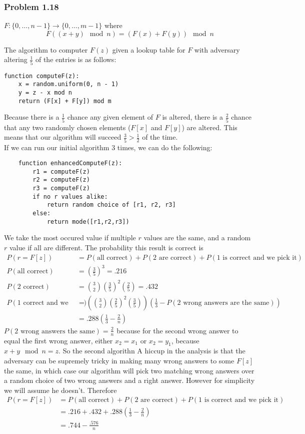 \documentclass[12pt,letterpaper]{article}
\newenvironment{answer}[1]{
  \subsubsection*{Problem #1}
}{\newpage}
\begin{document}
\begin{answer}{1.18}
$F : \{0, \ldots , n -1 \} \rightarrow \{0, \ldots, m-1\}$ where
$$F((x + y) \mod{n}) = (F(x) + F(y)) \mod{n}$$

The algorithm to computer $F(z)$ given a lookup table for $F$ with adversary altering $\frac{1}{5}$ of the entries is as follows:
\begin{verbatim}
function computeF(z):
    x = random.uniform(0, n - 1)
    y = z - x mod n
    return (F[x] + F[y]) mod m
\end{verbatim}

Because there is a $\frac{1}{5}$ chance any given element of $F$ is altered, there is a $\frac{2}{5}$ chance that any two randomly chosen elements ($F[x]$ and $F[y]$) are altered. This means that our algorithm will succeed $\frac{3}{5} > \frac{1}{2}$ of the time.
\\
If we can run our initial algorithm 3 times, we can do the following:
\begin{verbatim}
    function enhancedComputeF(z):
        r1 = computeF(z)
        r2 = computeF(z)
        r3 = computeF(z)
        if no r values alike:
            return random choice of [r1, r2, r3]
        else:
            return mode([r1,r2,r3])
\end{verbatim}
We take the most occured value if multiple $r$ values are the same, and a random $r$ value if all are different. The probability this result is correct is 
\begin{align*}
    P(r = F[z]) &= P(\text{all correct}) + P(\text{2 are correct}) + P(\text{1 is correct and we pick it}) \\
    P(\text{all correct}) &= \left(\frac{3}{5}\right)^3 = .216\\
    P(\text{2 correct}) &= {3 \choose 2}\left(\frac{3}{5}\right)^2 \left(\frac{2}{5}\right) = .432\\
    P(\text{1 correct and we pick it}) &= \left({3 \choose 2}\left(\frac{2}{5}\right)^2\left(\frac{3}{5}\right)\right)(\frac{1}{3} - P(\text{2 wrong answers are the same}))\\
    &= .288\left(\frac{1}{3} - \frac{2}{n}\right)
\end{align*}
$P(\text{2 wrong answers the same}) = \frac{2}{n}$ because for the second wrong answer to equal the first wrong answer, either $x_2 = x_1$ or $x_2 = y_1$, because $x + y \mod n = z$. So the second algorithn
A hiccup in the analysis is that the adversary can be supremely tricky in making many wrong answers to some $F[z]$ the same, in which case our algorithm will pick two matching wrong answers over a random choice of two wrong answers and a right answer. However for simplicity we will assume he doesn't. Therefore
\begin{align*}
    P(r = F[z]) &= P(\text{all correct}) + P(\text{2 are correct}) + P(\text{1 is correct and we pick it}) \\
    &= .216 + .432 + .288(\frac{1}{3} - \frac{2}{n}) \\
    &= .744 - \frac{.576}{n}
\end{align*}
\end{answer}
\end{document}
